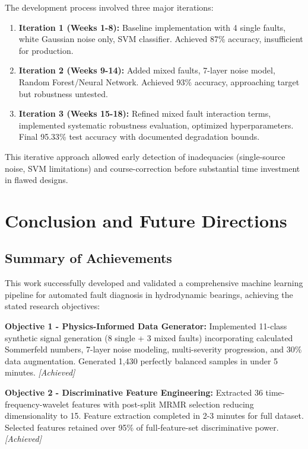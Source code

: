 \documentclass[11pt,a4paper]{article}
\begin{document}
The development process involved three major iterations:
\begin{enumerate}[itemsep=0.3em]
    \item \textbf{Iteration 1 (Weeks 1-8):} Baseline implementation with 4 single faults, white Gaussian noise only, SVM classifier. Achieved 87\% accuracy, insufficient for production.
    
    \item \textbf{Iteration 2 (Weeks 9-14):} Added mixed faults, 7-layer noise model, Random Forest/Neural Network. Achieved 93\% accuracy, approaching target but robustness untested.
    
    \item \textbf{Iteration 3 (Weeks 15-18):} Refined mixed fault interaction terms, implemented systematic robustness evaluation, optimized hyperparameters. Final 95.33\% test accuracy with documented degradation bounds.
\end{enumerate}

This iterative approach allowed early detection of inadequacies (single-source noise, SVM limitations) and course-correction before substantial time investment in flawed designs.

\section{Conclusion and Future Directions}

\subsection{Summary of Achievements}

This work successfully developed and validated a comprehensive machine learning pipeline for automated fault diagnosis in hydrodynamic bearings, achieving the stated research objectives:

\textbf{Objective 1 - Physics-Informed Data Generator:} Implemented 11-class synthetic signal generation (8 single + 3 mixed faults) incorporating calculated Sommerfeld numbers, 7-layer noise modeling, multi-severity progression, and 30\% data augmentation. Generated 1,430 perfectly balanced samples in under 5 minutes. \textit{[Achieved]}

\textbf{Objective 2 - Discriminative Feature Engineering:} Extracted 36 time-frequency-wavelet features with post-split MRMR selection reducing dimensionality to 15. Feature extraction completed in 2-3 minutes for full dataset. Selected features retained over 95\% of full-feature-set discriminative power. \textit{[Achieved]}
\end{document}
